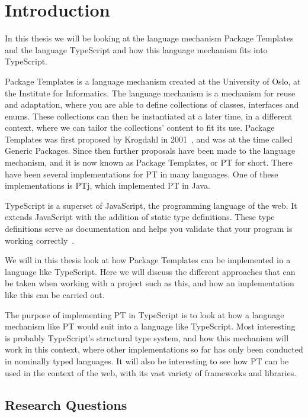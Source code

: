 
\chapter{Introduction}\label{ch:introduction}

In this thesis we will be looking at the language mechanism Package Templates and the language TypeScript and how this language mechanism fits into TypeScript.

Package Templates is a language mechanism created at the University of Oslo, at the Institute for Informatics.
The language mechanism is a mechanism for reuse and adaptation, where you are able to define collections of classes, interfaces and enums.
These collections can then be instantiated at a later time, in a different context, where we can tailor the collections' content to fit its use.
Package Templates was first proposed by Krogdahl in 2001~\cite{krogdahl:GP}, and was at the time called Generic Packages.
Since then further proposals have been made to the language mechanism, and it is now known as Package Templates, or PT for short.
There have been several implementations for PT in many languages.
One of these implementations is PTj, which implemented PT in Java.

TypeScript is a superset of JavaScript, the programming language of the web.
It extends JavaScript with the addition of static type definitions.
These type definitions serve as documentation and helps you validate that your program is working correctly~\cite{tswebsite}.

We will in this thesis look at how Package Templates can be implemented in a language like TypeScript.
Here we will discuss the different approaches that can be taken when working with a project such as this, and how an implementation like this can be carried out.


The purpose of implementing PT in TypeScript is to look at how a language mechanism like PT would suit into a language like TypeScript.
Most interesting is probably TypeScript's structural type system, and how this mechanism will work in this context, where other implementations so far has only been conducted in nominally typed languages.
It will also be interesting to see how PT can be used in the context of the web, with its vast variety of frameworks and libraries.

\section{Research Questions}\label{sec:research-questions}

